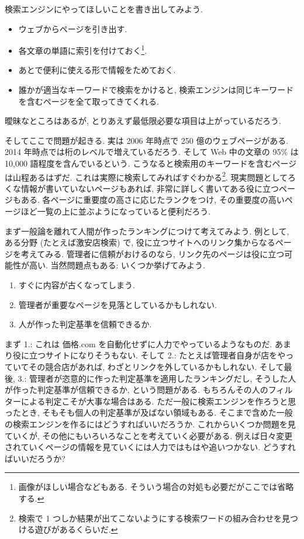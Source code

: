 \documentclass[openany, a4paper, oneside]{jsbook}
\begin{document}
検索エンジンにやってほしいことを書き出してみよう.
\begin{itemize}
\item ウェブからページを引き出す.
\item 各文章の単語に索引を付けておく\footnote{画像がほしい場合などもある.
そういう場合の対処も必要だがここでは省略する.}.
\item あとで便利に使える形で情報をためておく.
\item 誰かが適当なキーワードで検索をかけると, 検索エンジンは同じキーワードを含むページを全て取ってきてくれる.
\end{itemize}
曖昧なところはあるが, とりあえず最低限必要な項目は上がっているだろう.

そしてここで問題が起きる.
実は 2006 年時点で 250 億のウェブページがある.
2014 年時点では桁のレベルで増えているだろう.
そして Web 中の文章の 95\% は 10,000 語程度を含んでいるという.
こうなると検索用のキーワードを含むページは山程あるはずだ.
これは実際に検索してみればすぐわかる\footnote{検索で 1 つしか結果が出てこないようにする検索ワードの組み合わせを見つける遊びがあるくらいだ.}.
現実問題としてろくな情報が書いていないページもあれば,
非常に詳しく書いてある役に立つページもある.
各ページに重要度の高さに応じたランクをつけ,
その重要度の高いページほど一覧の上に並ぶようになっていると便利だろう.

まず一般論を離れて人間が作ったランキングにつけて考えてみよう.
例として, ある分野 (たとえば激安店検索) で,
役に立つサイトへのリンク集からなるページを考えてみる.
管理者に信頼がおけるのなら, リンク先のページは役に立つ可能性が高い.
当然問題点もある: いくつか挙げてみよう.
\begin{enumerate}
\item すぐに内容が古くなってしまう.
\item 管理者が重要なページを見落としているかもしれない.
\item 人が作った判定基準を信頼できるか.
\end{enumerate}
まず 1.:
これは 価格.com を自動化せずに人力でやっているようなものだ.
あまり役に立つサイトになりそうもない.
そして 2.:
たとえば管理者自身が店をやっていてその競合店があれば, わざとリンクを外しているかもしれない.
そして最後, 3.:
管理者が恣意的に作った判定基準を適用したランキングだし,
そうした人が作った判定基準が信頼できるか, という問題がある.
もちろんその人のフィルターによる判定こそが大事な場合はある.
ただ一般に検索エンジンを作ろうと思ったとき,
そもそも個人の判定基準が及ばない領域もある.
そこまで含めた一般の検索エンジンを作るにはどうすればいいだろうか.
これからいくつか問題を見ていくが, その他にもいろいろなことを考えていく必要がある.
例えば日々変更されていくページの情報を見ていくには人力ではもはや追いつかない.
どうすればいいだろうか?
\end{document}
